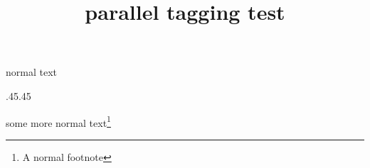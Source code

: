\documentclass{article}
\title{parallel tagging test}
\begin{document}
normal text %
\begin{Parallel}{.45\linewidth}{.45\linewidth}
\ParallelLText{ \kant[1] }
\ParallelPar
{}
\ParallelRText{ \kant[4] }
\end{Parallel}
some more normal text\footnote{A normal footnote}
\end{document}

